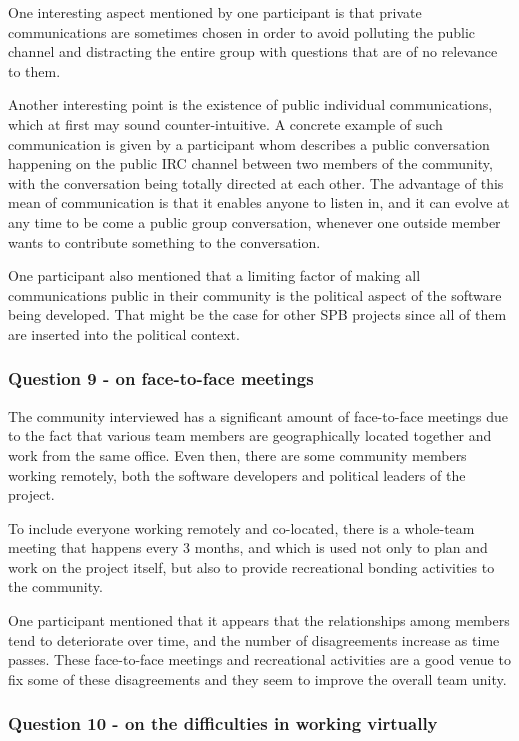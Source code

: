 \documentclass{sigchi}
\begin{document}
One interesting aspect mentioned by one participant is that private communications are sometimes chosen in order to avoid polluting the public channel and distracting the entire group with questions that are of no relevance to them.

Another interesting point is the existence of public individual communications, which at first may sound counter-intuitive. A concrete example of such communication is given by a participant whom describes a public conversation happening on the public IRC channel between two members of the community, with the conversation being totally directed at each other. The advantage of this mean of communication is that it enables anyone to listen in, and it can evolve at any time to be come a public group conversation, whenever one outside member wants to contribute something to the conversation.

One participant also mentioned that a limiting factor of making all communications public in their community is the political aspect of the software being developed. That might be the case for other SPB projects since all of them are inserted into the political context.

\subsubsection{Question 9 - on face-to-face meetings}

The community interviewed has a significant amount of face-to-face meetings due to the fact that various team members are geographically located together and work from the same office. Even then, there are some community members working remotely, both the software developers and political leaders of the project.

To include everyone working remotely and co-located, there is a whole-team meeting that happens every 3 months, and which is used not only to plan and work on the project itself, but also to provide recreational bonding activities to the community. 

One participant mentioned that it appears that the relationships among members tend to deteriorate over time, and the number of disagreements increase as time passes. These face-to-face meetings and recreational activities are a good venue to fix some of these disagreements and they seem to improve the overall team unity.

\subsubsection{Question 10 - on the difficulties in working virtually}
\end{document}
